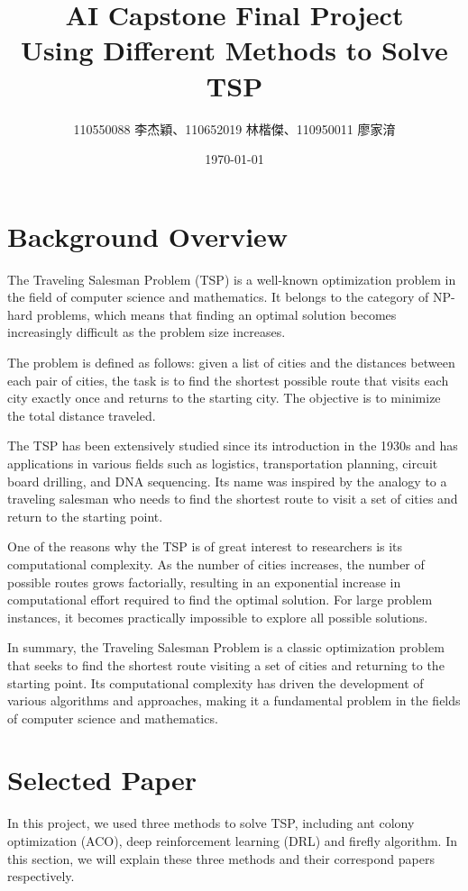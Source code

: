 \documentclass[twocolumn, a4paper]{extarticle}
\title{AI Capstone Final Project \\ Using Different Methods to Solve TSP}
\author{110550088 李杰穎、110652019 林楷傑、110950011 廖家淯}
\date{\today}
\begin{document}
\maketitle

\section{Background Overview}

The Traveling Salesman Problem (TSP) is a well-known optimization problem in the field of computer science and mathematics. It belongs to the category of NP-hard problems, which means that finding an optimal solution becomes increasingly difficult as the problem size increases.

The problem is defined as follows: given a list of cities and the distances between each pair of cities, the task is to find the shortest possible route that visits each city exactly once and returns to the starting city. The objective is to minimize the total distance traveled.

The TSP has been extensively studied since its introduction in the 1930s and has applications in various fields such as logistics, transportation planning, circuit board drilling, and DNA sequencing. Its name was inspired by the analogy to a traveling salesman who needs to find the shortest route to visit a set of cities and return to the starting point.

One of the reasons why the TSP is of great interest to researchers is its computational complexity. As the number of cities increases, the number of possible routes grows factorially, resulting in an exponential increase in computational effort required to find the optimal solution. For large problem instances, it becomes practically impossible to explore all possible solutions.

In summary, the Traveling Salesman Problem is a classic optimization problem that seeks to find the shortest route visiting a set of cities and returning to the starting point. Its computational complexity has driven the development of various algorithms and approaches, making it a fundamental problem in the fields of computer science and mathematics.


\section{Selected Paper}

In this project, we used three methods to solve TSP, including ant colony optimization (ACO), deep reinforcement learning (DRL) and firefly algorithm. In this section, we will explain these three methods and their correspond papers respectively.
\end{document}
